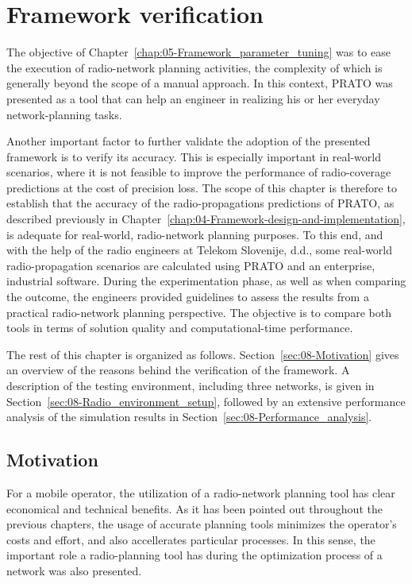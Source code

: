 
\chapter{Framework verification \label{chap:08-Real-world_network_planning}}


\noindent The objective of Chapter~\ref{chap:05-Framework_parameter_tuning}
was to ease the execution of radio-network planning activities, the
complexity of which is generally beyond the scope of a manual approach.
In this context, PRATO was presented as a tool that can help an engineer
in realizing his or her everyday network-planning tasks.

Another important factor to further validate the adoption of the presented
framework is to verify its accuracy. This is especially important
in real-world scenarios, where it is not feasible to improve the performance
of radio-coverage predictions at the cost of precision loss. The scope
of this chapter is therefore to establish that the accuracy of the
radio-propagations predictions of PRATO, as described previously in
Chapter~\ref{chap:04-Framework-design-and-implementation}, is adequate
for real-world, radio-network planning purposes. To this end, and
with the help of the radio engineers at Telekom Slovenije, d.d., some
real-world radio-propagation scenarios are calculated using PRATO
and an enterprise, industrial software. During the experimentation
phase, as well as when comparing the outcome, the engineers provided
guidelines to assess the results from a practical radio-network planning
perspective. The objective is to compare both tools in terms of solution
quality and computational-time performance. 

The rest of this chapter is organized as follows. Section~\ref{sec:08-Motivation}
gives an overview of the reasons behind the verification of the framework.
A description of the testing environment, including three networks,
is given in Section~\ref{sec:08-Radio_environment_setup}, followed
by an extensive performance analysis of the simulation results in
Section~\ref{sec:08-Performance_analysis}.


\section{Motivation \label{sec:08-Motivation}}

For a mobile operator, the utilization of a radio-network planning
tool has clear economical and technical benefits. As it has been pointed
out throughout the previous chapters, the usage of accurate planning
tools minimizes the operator's costs and effort, and also accellerates
particular processes. In this sense, the important role a radio-planning
tool has during the optimization process of a network was also presented. 

